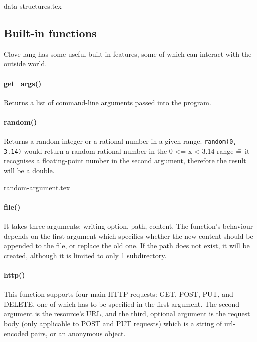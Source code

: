 \documentclass[12pt,a4paper]{article}
\begin{document}
{data-structures.tex}





\vspace{-1.75em}
\subsection*{Built-in functions}
Clove-lang has some useful built-in features, some of which can interact with the outside world.

\paragraph*{get\_args()}
Returns a list of command-line arguments passed into the program.

\vspace{-0.75em}
\paragraph*{random()}
Returns a random integer or a rational number in a given range. \texttt{random(0, 3.14)} would return a random rational number in the 0 <= x < 3.14 range \==~it recognises a floating-point number in the second argument, therefore the result will be a double.

{random-argument.tex}


\vspace{-2.75em}
\paragraph*{file()}
It takes three arguments: writing option, path, content. The function's behaviour depends on the first argument which specifies whether the new content should be appended to the file, or replace the old one. If the path does not exist, it will be created, although it is limited to only 1 subdirectory.

\vspace{-0.75em}
\paragraph*{http()}
This function supports four main HTTP requests: GET, POST, PUT, and DELETE, one of which has to be specified in the first argument. The second argument is the resource's URL, and the third, optional argument is the request body (only applicable to POST and PUT requests) which is a string of url-encoded pairs, or an anonymous object.
\end{document}
